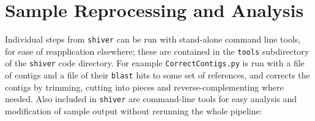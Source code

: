 \documentclass{article}
\newcommand{\shiv}{\c{shiver}\xspace}
\let\c\texttt
\begin{document}
\section{Sample Reprocessing and Analysis}
Individual steps from \shiv can be run with stand-alone command line tools, for ease of reapplication elsewhere; these are contained in the \c{tools} subdirectory of the \shiv code directory.
For example \c{CorrectContigs.py} is run with a file of contigs and a file of their \c{blast} hits to some set of references, and corrects the contigs by trimming, cutting into pieces and reverse-complementing where needed.
Also included in \shiv are command-line tools for easy analysis and modification of sample output without rerunning the whole pipeline:
\end{document}
